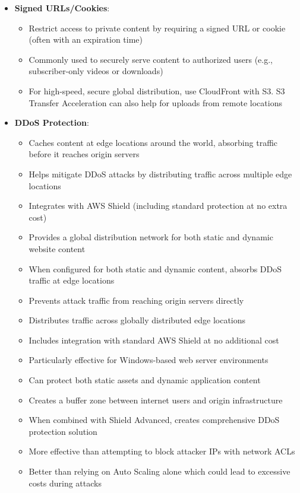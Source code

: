 \documentclass[11pt,a4paper]{report}
\begin{document}
\begin{itemize}
  \item \textbf{Signed URLs/Cookies}:
\begin{itemize}
  \item Restrict access to private content by requiring a signed URL or cookie (often with an expiration time)
  \item Commonly used to securely serve content to authorized users (e.g., subscriber-only videos or downloads)
  \item For high-speed, secure global distribution, use CloudFront with S3. S3 Transfer Acceleration can also help for uploads from remote locations
\end{itemize}
  \item \textbf{DDoS Protection}:
\begin{itemize}
  \item Caches content at edge locations around the world, absorbing traffic before it reaches origin servers
  \item Helps mitigate DDoS attacks by distributing traffic across multiple edge locations
  \item Integrates with AWS Shield (including standard protection at no extra cost)
  \item Provides a global distribution network for both static and dynamic website content
  \item When configured for both static and dynamic content, absorbs DDoS traffic at edge locations
  \item Prevents attack traffic from reaching origin servers directly
  \item Distributes traffic across globally distributed edge locations
  \item Includes integration with standard AWS Shield at no additional cost
  \item Particularly effective for Windows-based web server environments
  \item Can protect both static assets and dynamic application content
  \item Creates a buffer zone between internet users and origin infrastructure
  \item When combined with Shield Advanced, creates comprehensive DDoS protection solution
  \item More effective than attempting to block attacker IPs with network ACLs
  \item Better than relying on Auto Scaling alone which could lead to excessive costs during attacks
\end{itemize}

\end{itemize}
\end{document}
